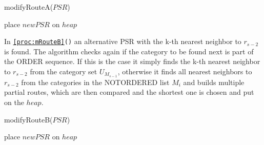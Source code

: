 \begin{procedure}[H]
\caption{modifyRouteA($PSR$)}
\label{proc:mRouteA}


	place $newPSR$ on $heap$\;
\end{procedure}

\vspace{\baselineskip}

In \texttt{\ref{proc:mRouteB}()} an alternative PSR with the k-th nearest neighbor to $r_{s-2}$ is found. The algorithm checks again if the category to be found next is part of the ORDER sequence. If this is the case it simply finds the k-th nearest neighbor to $r_{s-2}$ from the category set $U_{M_{s-1}}$, otherwise it finds all nearest neighbors to $r_{s-2}$ from the categories in the NOTORDERED list $M_{i}$ and builds multiple partial routes, which are then compared and the shortest one is chosen and put on the $heap$. \newline

\begin{procedure}[H]
\caption{modifyRouteB($PSR$)}
\label{proc:mRouteB}
	
	

	place $newPSR$ on $heap$\;
\end{procedure}

